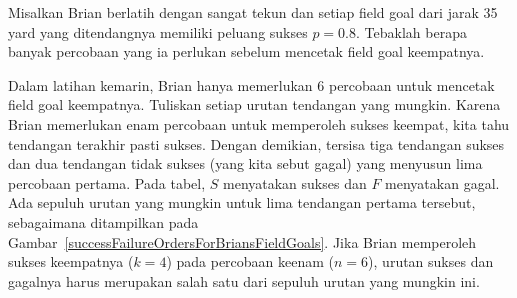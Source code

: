 \begin{exercisewrap}
\begin{nexercise}
Misalkan Brian berlatih dengan sangat tekun dan setiap field goal dari jarak 35 yard yang ditendangnya memiliki peluang sukses $p=0.8$. Tebaklah berapa banyak percobaan yang ia perlukan sebelum mencetak field goal keempatnya.\footnotemark
\end{nexercise}
\end{exercisewrap}

\begin{examplewrap}
\begin{nexample}{Dalam latihan kemarin, Brian hanya memerlukan 6 percobaan untuk mencetak field goal keempatnya. Tuliskan setiap urutan tendangan yang mungkin.} \label{eachSeqOfSixTriesToGetFourSuccesses}
Karena Brian memerlukan enam percobaan untuk memperoleh sukses keempat, kita tahu tendangan terakhir pasti sukses. Dengan demikian, tersisa tiga tendangan sukses dan dua tendangan tidak sukses (yang kita sebut gagal) yang menyusun lima percobaan pertama. Pada tabel, $S$ menyatakan sukses dan $F$ menyatakan gagal. Ada sepuluh urutan yang mungkin untuk lima tendangan pertama tersebut, sebagaimana ditampilkan pada Gambar~\ref{successFailureOrdersForBriansFieldGoals}. Jika Brian memperoleh sukses keempatnya ($k=4$) pada percobaan keenam ($n=6$), urutan sukses dan gagalnya harus merupakan salah satu dari sepuluh urutan yang mungkin ini.
\end{nexample}
\end{examplewrap}

